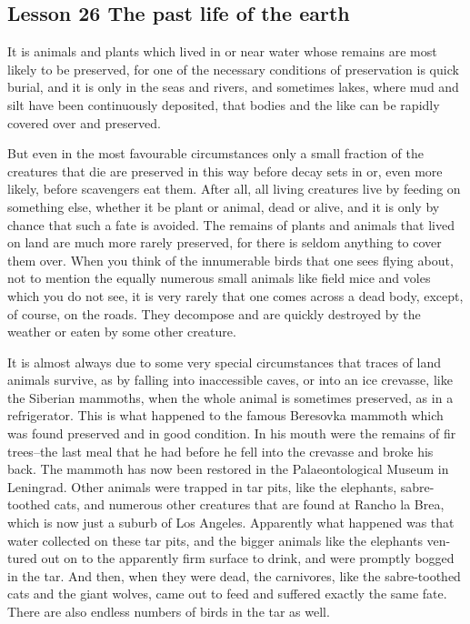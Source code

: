 \documentclass[kindlepaper]{BHCexam4kindle}
\begin{document}
\subsection{Lesson 26
The past life of the earth}
\par
It is animals and plants which lived in or near water whose remains are most
likely to be preserved, for one of the necessary conditions of preservation is quick
burial, and it is only in the seas and rivers, and sometimes lakes, where mud and
silt have been continuously deposited, that bodies and the like can be rapidly
covered over and preserved.
\par
But even in the most favourable circumstances only a small fraction of the
creatures that die are preserved in this way before decay sets in or, even more
likely, before scavengers eat them. After all, all living creatures live by feeding
on something else, whether it be plant or animal, dead or alive, and it is only by
chance that such a fate is avoided. The remains of plants and animals that lived
on land are much more rarely preserved, for there is seldom anything to cover
them over. When you think of the innumerable birds that one sees flying about,
not to mention the equally numerous small animals like field mice and voles
which you do not see, it is very rarely that one comes across a dead body, except,
of course, on the roads. They decompose and are quickly destroyed by the
weather or eaten by some other creature.
\par
It is almost always due to some very special circumstances that traces of land
animals survive, as by falling into inaccessible caves, or into an ice crevasse, like
the Siberian mammoths, when the whole animal is sometimes preserved, as in
a refrigerator. This is what happened to the famous Beresovka mammoth which
was found preserved and in good condition. In his mouth were the remains of
fir trees--the last meal that he had before he fell into the crevasse and broke his
back. The mammoth has now been restored in the Palaeontological Museum in
Leningrad. Other animals were trapped in tar pits, like the elephants, sabre-
toothed cats, and numerous other creatures that are found at Rancho la Brea,
which is now just a suburb of Los Angeles. Apparently what happened was that
water collected on these tar pits, and the bigger animals like the elephants ven-
tured out on to the apparently firm surface to drink, and were promptly bogged
in the tar. And then, when they were dead, the carnivores, like the sabre-toothed
cats and the giant wolves, came out to feed and suffered exactly the same fate.
There are also endless numbers of birds in the tar as well.
\clearpage
\end{document}
